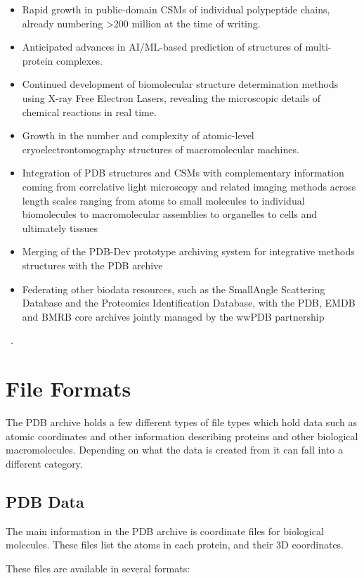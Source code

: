 \documentclass{report}
\begin{document}
\begin{itemize}
    \item Rapid growth in public-domain CSMs of individual polypeptide chains, already numbering >200 million at the time of writing.
    \item Anticipated advances in AI/ML-based prediction of structures of multi-protein complexes.
    \item Continued development of biomolecular structure determination methods using X-ray Free Electron Lasers, revealing the microscopic details of chemical reactions in real time.
    \item Growth in the number and complexity of atomic-level cryoelectrontomography structures of macromolecular machines.
    \item Integration of PDB structures and CSMs with complementary information coming from correlative light microscopy and related imaging methods across length scales ranging from atoms to small molecules to individual biomolecules to macromolecular assemblies to organelles to cells and ultimately tissues
    \item Merging of the PDB-Dev prototype archiving system for integrative methods structures with the PDB archive
    \item Federating other biodata resources, such as the SmallAngle Scattering Database and the Proteomics Identification Database, with the PDB, EMDB and BMRB core archives jointly managed by the wwPDB partnership
\end{itemize}
~\cite{burley1_rcsb_2022}.

\section{File Formats}

The PDB archive holds a few different types of file types which hold data such as atomic coordinates and other information describing proteins and other biological macromolecules. Depending on what the data is created from it can fall into a different category.

\subsection{PDB Data}

The main information in the PDB archive is coordinate files for biological molecules. These files list the atoms in each protein, and their 3D coordinates.

These files are available in several formats:
\end{document}
